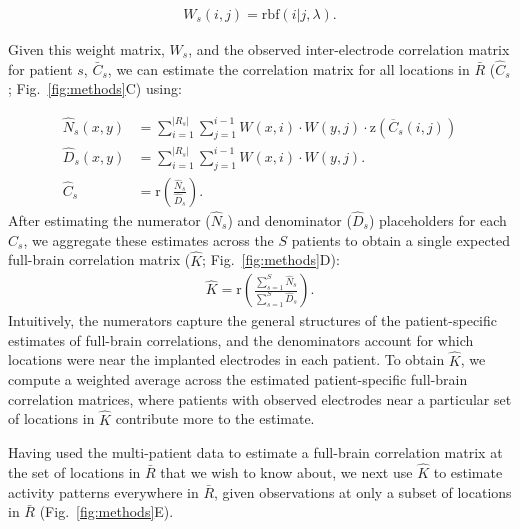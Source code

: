 \documentclass[11pt]{article}
\providecommand{\DIFaddtex}[1]{{\protect\color{blue}\uwave{#1}}} %
\providecommand{\DIFdeltex}[1]{{\protect\color{red}\sout{#1}}}                      %
\providecommand{\DIFaddbegin}{} %
\providecommand{\DIFaddend}{} %
\providecommand{\DIFdelbegin}{} %
\providecommand{\DIFdelend}{} %
\providecommand{\DIFadd}[1]{\texorpdfstring{\DIFaddtex{#1}}{#1}} %
\providecommand{\DIFdel}[1]{\texorpdfstring{\DIFdeltex{#1}}{}} %
\newcommand{\DIFscaledelfig}{0.5}
\newlength{\DIFdelgraphicswidth} %
\newlength{\DIFdelgraphicsheight} %
\newcommand{\DIFaddincludegraphics}[2][]{{\color{blue}\fbox{\DIFOincludegraphics[#1]{#2}}}} %
\newcommand{\DIFdelincludegraphics}[2][]{%
\sbox{\DIFdelgraphicsbox}{\DIFOincludegraphics[#1]{#2}}%
\settoboxwidth{\DIFdelgraphicswidth}{\DIFdelgraphicsbox} %
\settoboxtotalheight{\DIFdelgraphicsheight}{\DIFdelgraphicsbox} %
\scalebox{\DIFscaledelfig}{%
\parbox[b]{\DIFdelgraphicswidth}{\usebox{\DIFdelgraphicsbox}\\[-\baselineskip] \rule{\DIFdelgraphicswidth}{0em}}\llap{\resizebox{\DIFdelgraphicswidth}{\DIFdelgraphicsheight}{%
\setlength{\unitlength}{\DIFdelgraphicswidth}%
\begin{picture}(1,1)%
\thicklines\linethickness{2pt} %
{\color[rgb]{1,0,0}\put(0,0){\framebox(1,1){}}}%
{\color[rgb]{1,0,0}\put(0,0){\line( 1,1){1}}}%
{\color[rgb]{1,0,0}\put(0,1){\line(1,-1){1}}}%
\end{picture}%
}\hspace*{3pt}}} %
} %
\DeclareRobustCommand{\DIFaddbegin}{\DIFOaddbegin \let\includegraphics\DIFaddincludegraphics} %
\DeclareRobustCommand{\DIFaddend}{\DIFOaddend \let\includegraphics\DIFOincludegraphics} %
\DeclareRobustCommand{\DIFdelbegin}{\DIFOdelbegin \let\includegraphics\DIFdelincludegraphics} %
\DeclareRobustCommand{\DIFdelend}{\DIFOaddend \let\includegraphics\DIFOincludegraphics} %
\begin{document}
\begin{align}
W_s(i, j) = \mathrm{rbf}(i|j,\lambda)\label{eqn:weight_matrix}.
\end{align}

Given this weight matrix, $W_s$, and the observed inter-electrode correlation
matrix for patient $s$, \DIFdelbegin \DIFdel{$\bar{C}_{s}$}\DIFdelend \DIFaddbegin \DIFadd{$\overline{C}_{s}$}\DIFaddend , we can estimate the correlation matrix
for all locations in \DIFdelbegin \DIFdel{$\bar{R}$ }\DIFdelend \DIFaddbegin \DIFadd{$\overline{R}$ }\DIFaddend ($\hat{C}_s$; Fig.~\ref{fig:methods}C) using:

\begin{align}
\hat{N}_{s}(x,y) & = { \sum_{i = 1}^{| R_{s}|}\sum_{j=1}^{i-1} W(x,i) \cdot W(y,j)\cdot \mathrm{z}(\DIFdelbegin %
\DIFdelend \DIFaddbegin \overline{C}\DIFaddend _{s}(i,j))}\label{eqn:subj_corrmat_num}\\
 \hat{D}_{s}(x,y) & = \sum_{i = 1}^{| R_{s}|}\sum_{j=1}^{i-1} W(x,i)
                    \cdot W(y,j). \label{eqn:subj_corrmat_den}\\
 \hat{C}_s &= \mathrm{r}\left( \frac{\hat{N}_{s}}{\hat{D}_{s}} \right)
             \label{eqn:subj_corrmat}.
\end{align}
After estimating the numerator ($\hat{N}_{s}$) and denominator
($\hat{D}_{s}$) placeholders for each $\hat{C}_{s}$, we aggregate these
estimates across the $S$ patients to obtain a single expected full-brain
correlation matrix ($\hat{K}$; Fig.~\ref{fig:methods}D):
\begin{align}
 \hat{K} = \mathrm{r} \left(  \frac{\sum_{s=1}^S  \hat{N}_{s}}{\sum_{s=1}^S \hat{D}_{s}}\right).\label{eqn:corrmat}
\end{align}
Intuitively, the numerators capture the general structures of the
patient-specific estimates of full-brain correlations, and the
denominators account for which locations were near the implanted
electrodes in each patient.  To obtain $\hat{K}$, we compute a
weighted average across the estimated patient-specific full-brain
correlation matrices, where patients with observed electrodes near a
particular set of locations in $\hat{K}$ contribute more to the
estimate.

Having used the multi-patient data to estimate a full-brain correlation matrix
at the set of locations in \DIFdelbegin \DIFdel{$\bar{R}$ }\DIFdelend \DIFaddbegin \DIFadd{$\overline{R}$ }\DIFaddend that we wish to know about, we next use
$\hat{K}$ to estimate activity patterns everywhere in \DIFdelbegin \DIFdel{$\bar{R}$}\DIFdelend \DIFaddbegin \DIFadd{$\overline{R}$}\DIFaddend , given
observations at only a subset of locations in \DIFdelbegin \DIFdel{$\bar{R}$ }\DIFdelend \DIFaddbegin \DIFadd{$\overline{R}$
}\DIFaddend (Fig.~\ref{fig:methods}E).
\end{document}
